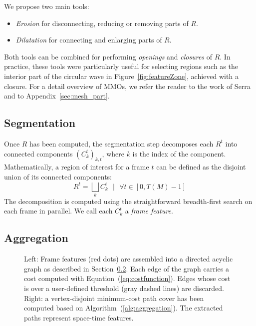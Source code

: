 \documentclass[review]{acmsiggraph}
\begin{document}
We propose two main tools:
\begin{itemize}
 \item \emph{Erosion} for disconnecting, reducing or removing parts of $R$.
 \item \emph{Dilatation} for connecting and enlarging parts of $R$.
\end{itemize}
Both tools can be combined for performing \emph{openings} and \emph{closures} of $R$.
In practice, these tools were particularly useful for selecting regions such as the interior part of the circular wave in Figure~\ref{fig:featureZone}, achieved with a closure.
For a detail overview of MMOs, we refer the reader to the work of Serra~\cite{Serra1986} and to Appendix~\ref{sec:mesh_part}.


\subsection{Segmentation}\label{sec:features:segmentation}
Once $R$ has been computed, the segmentation step decomposes each $R^t$ into connected components $(C_k^t)_{k,t}$, where $k$ is the index of the component. Mathematically, a region of interest for a frame $t$ can be defined as the disjoint union of its connected components:
\begin{equation}
 R^t = \bigsqcup_k C_k^t \text{~~} \vert \text{~~} \forall t \in [0, T(M)-1]
\end{equation}
The decomposition is computed using the straightforward breadth-first search on each frame in parallel. 
We call each $C_{k}^{t}$ a \emph{frame feature}.

\subsection{Aggregation}\label{sec:features:aggregation}

\begin{figure}[t]
\centering
\subfigure[Initial DAG]{\label{fig:dagFeatures}
\centering
\resizebox{0.48\linewidth}{!}{}}
\subfigure[Vertex-disjoint path cover]{\label{fig:aggregatedFeatures}
\centering
\resizebox{0.48\linewidth}{!}{}}
\caption{
    Left: Frame features (red dots) are assembled into a directed acyclic graph as described in Section~\ref{sec:features:aggregation}.
Each edge of the graph carries a cost computed with Equation~(\ref{eq:costfunction}). 
Edges whose cost is over a user-defined threshold (gray dashed lines) are discarded.
Right: a vertex-disjoint minimum-cost path cover has been computed based on Algorithm~(\ref{alg:aggregation}). 
The extracted paths represent space-time features.}
\label{fig:aggregation}
\end{figure}
\end{document}
